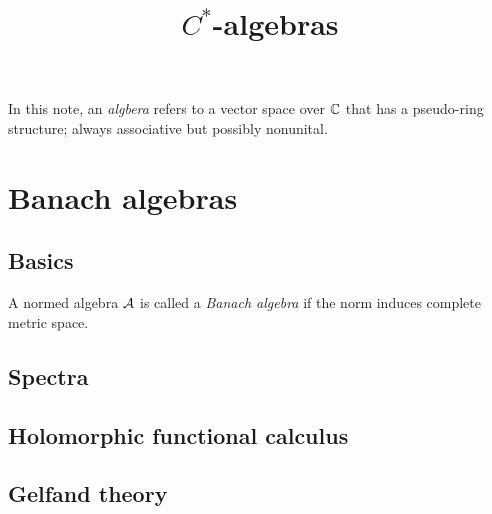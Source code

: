 \documentclass{../exp}
\title{$C^*$-algebras}
\begin{document}
\maketitle
\tableofcontents

\begin{defn*}
In this note, an \emph{algbera} refers to a vector space over $\mathbb{C}$ that has a pseudo-ring structure; always associative but possibly nonunital.
\end{defn*}

\section{Banach algebras}

\subsection{Basics}
\begin{defn}
A normed algebra $\mathcal{A}$ is called a \emph{Banach algebra} if the norm induces complete metric space.
\end{defn}


\subsection{Spectra}





\subsection{Holomorphic functional calculus}



\subsection{Gelfand theory}



\end{document}
